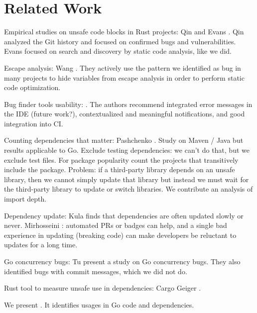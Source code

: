 \section{Related Work}
\label{sec:rw}

Empirical studies on unsafe code blocks in Rust projects: Qin \cite{qin2020} and Evans \cite{evans2020}.
Qin analyzed the Git history and focused on confirmed bugs and vulnerabilities.
Evans focused on search and discovery by static code analysis, like we did.

Escape analysis: Wang \cite{wang2020}. They actively use the pattern we identified as bug in many projects to hide variables from escape analysis in order to perform static code optimization.

Bug finder tools usability: \cite{smith2020}. The authors recommend integrated error messages in the IDE (future work?), contextualized and meaningful notifications, and good integration into CI.

Counting dependencies that matter: Pashchenko \cite{pashchenko2018}. Study on Maven / Java but results applicable to Go.
Exclude testing dependencies: we can't do that, but we exclude test files.
For package popularity count the projects that transitively include the package.
Problem: if a third-party library depends on an unsafe library, then we cannot simply update that library but instead we must wait for the third-party library to update or switch libraries.
We contribute an analysis of import depth.

Dependency update: Kula \cite{kula2017} finds that dependencies are often updated slowly or never. Mirhosseini \cite{mirhosseini2017}: automated PRs or badges can help, and a single bad experience in updating (breaking code) can make developers be reluctant to updates for a long time.

Go concurrency bugs: Tu \cite{tu2019} present a study on Go concurrency bugs. They also identified bugs with commit messages, which we did not do.

Rust tool to measure unsafe use in dependencies: Cargo Geiger \cite{cargogeiger}.

We present \toolUsage{}. It identifies \unsafe{} usages in Go code and dependencies.